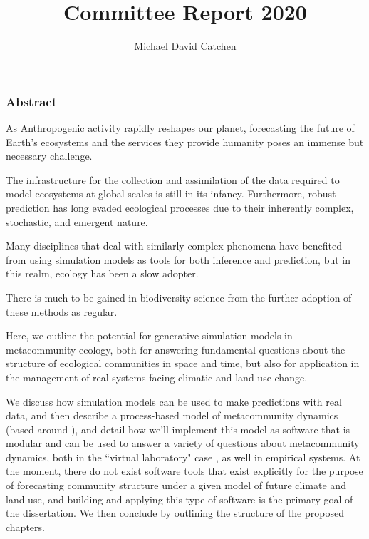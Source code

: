 \documentclass[]{article}
\title{Committee Report 2020}
\author{Michael David Catchen}
\date{}
\begin{document}
\maketitle

\vspace{3em}
\subsubsection*{Abstract}

As Anthropogenic activity rapidly reshapes our planet, forecasting the future of Earth's ecosystems and the services they provide humanity poses an immense but necessary challenge. 

The infrastructure for the collection and assimilation of the data required to model ecosystems at global scales is still in its infancy. Furthermore, robust prediction has long evaded ecological processes due to their inherently complex, stochastic, and emergent nature.


Many disciplines that deal with similarly complex phenomena have benefited from using simulation models as tools for both inference and prediction, but in this realm, ecology has been a slow adopter.

There is much to be gained in biodiversity science from the further adoption of these methods as regular.

Here, we outline the potential for generative simulation models in metacommunity ecology, both for answering fundamental questions about the structure of ecological communities in space and time, but also for application in the management of real systems facing climatic and land-use change.


We discuss how simulation models can be used to make predictions with real data, and then
describe a process-based model of metacommunity dynamics (based around \citep{vellend_conceptual_2010, poisot_beyond_2015, thompson_process-based_2020}), and detail how we'll implement this model as software that is modular and can be used to answer a variety of questions about metacommunity dynamics, both in the ``virtual laboratory" case \citep{railsback_agent-based_2011}, as well in empirical systems.
At the moment, there do not exist software tools that exist explicitly for the purpose of forecasting community structure under a given model of future climate and land use, and building and applying this type of software is the primary goal of the dissertation.
We then conclude by outlining the structure of the proposed chapters.  
    
\end{document}
